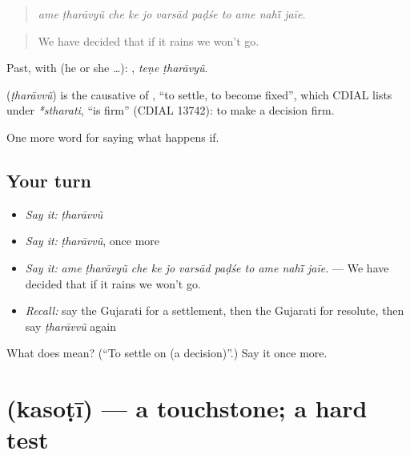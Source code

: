 \begin{quote}
\emph{ame ṭharāvyũ che ke jo varsād paḍśe to ame nahī̃ jaīe.}
\end{quote}

\begin{quote}
We have decided that if it rains we won't go.
\end{quote}

Past, with  (he or she …):  , \emph{teṇe ṭharāvyũ}.

\begin{cousinweb}
\textbf{} (\emph{ṭharāvvũ}) is the causative of \textbf{}, \textquotedblleft{}to settle, to become fixed\textquotedblright{}, which CDIAL lists under \emph{*stharati}, \textquotedblleft{}is firm\textquotedblright{} (CDIAL 13742): to make a decision firm.
\end{cousinweb}

\begin{grammarlens}[title={What you've built}]
One more word for saying what happens if.
\end{grammarlens}

\subsection*{Your turn}
\begin{itemize}
\raggedright
  \item \emph{Say it:} \emph{ṭharāvvũ}
  \item \emph{Say it:} \emph{ṭharāvvũ}, once more
  \item \emph{Say it:} \emph{ame ṭharāvyũ che ke jo varsād paḍśe to ame nahī̃ jaīe.} — We have decided that if it rains we won't go.
  \item \emph{Recall:} say the Gujarati for a settlement, then the Gujarati for resolute, then say \emph{ṭharāvvũ} again
\end{itemize}

\begin{tcolorbox}[breakable,colback=teal!4,colframe=teal!35!black,title={Before you move on}]
What does  mean? (\textquotedblleft{}To settle on (a decision)\textquotedblright{}.) Say it once more.
\end{tcolorbox}
\section[\texorpdfstring{\gu{કસોટી} (kasoṭī)}{કસોટી (kasoṭī)}]{ (kasoṭī) — a touchstone; a hard test}

